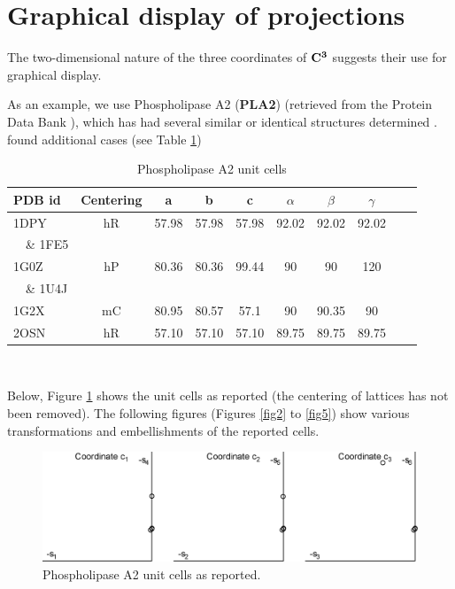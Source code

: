 \documentclass[preprint]{iucr}              %
\numberwithin{equation}{section}
\newcommand{\CIII}[0]{$\bf{C^{3}}$}
\begin{document}
	
	\section{Graphical display of projections}
	
	The two-dimensional nature of the three coordinates of \CIII{} 
	suggests their use for graphical display. 
	
	As an example, we use Phospholipase A2 (\textbf{PLA2}) (retrieved from 
	the Protein Data Bank \cite{Bernstein1977}), which has had several similar
	or identical structures determined \cite{LeTrong2007}. 
	found additional cases (see Table \ref{PLA2})
	
	
	\begin{table}
		\begin{tabular}{m{} c c c c c c c c c}
			\toprule
			PDB id & Centering & a&b&c&$\alpha$&$\beta$&$\gamma$\\
			\midrule
			1DPY & hR& 57.98& 57.98& 57.98& 92.02& 92.02& 92.02\\
			~~\& 1FE5 \\
			1G0Z  & hP& 80.36& 80.36& 99.44& 90&    90&    120\\
			~~\& 1U4J\\
			1G2X & mC& 80.95& 80.57& 57.1 & 90&    90.35&  90\\
			2OSN & hR& 57.10& 57.10& 57.10& 89.75& 89.75&  89.75\\
			\bottomrule
		\end{tabular}	\\
		\caption{Phospholipase A2 unit cells}
		\label{PLA2}
	\end{table}
	
	Below, Figure \ref{fig1} shows the unit cells as 
	reported (the centering of lattices has not been removed).
	The following figures (Figures \ref{fig2} to \ref{fig5}) show various transformations and
	embellishments of the reported cells.
	
	\begin{figure}
		\includegraphics[width=1.0\textwidth]{1_35}
		\caption{Phospholipase A2 unit cells as reported. }
		\label{fig1}
	\end{figure}
	
\end{document}
